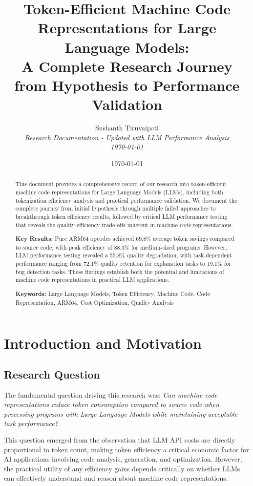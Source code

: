 \documentclass[11pt,a4paper]{article}
\title{\textbf{Token-Efficient Machine Code Representations for Large Language Models:\\
A Complete Research Journey from Hypothesis to Performance Validation}}
\author{Sushanth Tiruvaipati\\
\textit{Research Documentation - Updated with LLM Performance Analysis}\\
\textit{\today}}
\date{\today}
\begin{document}
\maketitle

\begin{abstract}
This document provides a comprehensive record of our research into token-efficient machine code representations for Large Language Models (LLMs), including both tokenization efficiency analysis and practical performance validation. We document the complete journey from initial hypothesis through multiple failed approaches to breakthrough token efficiency results, followed by critical LLM performance testing that reveals the quality-efficiency trade-offs inherent in machine code representations.

\textbf{Key Results:} Pure ARM64 opcodes achieved 69.8\% average token savings compared to source code, with peak efficiency of 88.3\% for medium-sized programs. However, LLM performance testing revealed a 55.8\% quality degradation, with task-dependent performance ranging from 72.1\% quality retention for explanation tasks to 19.1\% for bug detection tasks. These findings establish both the potential and limitations of machine code representations in practical LLM applications.

\textbf{Keywords:} Large Language Models, Token Efficiency, Machine Code, Code Representation, ARM64, Cost Optimization, Quality Analysis
\end{abstract}

\tableofcontents
\newpage

\section{Introduction and Motivation}

\subsection{Research Question}
The fundamental question driving this research was: \textit{Can machine code representations reduce token consumption compared to source code when processing programs with Large Language Models while maintaining acceptable task performance?}

This question emerged from the observation that LLM API costs are directly proportional to token count, making token efficiency a critical economic factor for AI applications involving code analysis, generation, and optimization. However, the practical utility of any efficiency gains depends critically on whether LLMs can effectively understand and reason about machine code representations.
\end{document}
